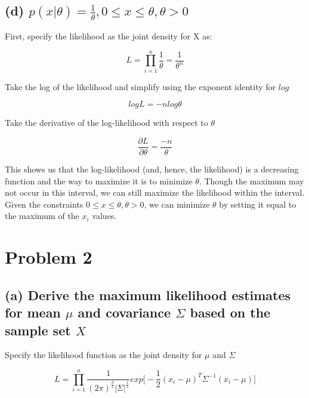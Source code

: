 \documentclass{article}
\begin{document}
\subsection{(d) $p(x|\theta) = \frac{1}{\theta}, 0 \leq x \leq \theta, \theta > 0$}

\noindent First, specify the likelihood as the joint density for X as:

\begin{equation}
L = \prod\limits_{i = 1}^n \frac{1}{\theta} = \frac{1}{\theta^n}
\end{equation}

\noindent Take the log of the likelihood and simplify using the exponent identity for $log$

\begin{equation}
log L = - n log \theta
\end{equation}

\noindent Take the derivative of the log-likelihood with respect to $\theta$

\begin{equation}
\frac{\partial L}{ \partial \theta } = \frac{-n}{\theta}
\end{equation}

\noindent This shows us that the log-likelihood (and, hence, the likelihood) is a decreasing function and the way to maximize it is to minimize $\theta$.  Though the maximum may not occur in this interval, we can still maximize the likelihood within the interval. Given the constraints $0 \leq x \leq \theta, \theta > 0$, we can minimize $\theta$ by setting it equal to the maximum of the $x_i$ values.

\section{Problem 2}

\subsection{(a) Derive the maximum likelihood estimates for mean $\mu$ and covariance $\Sigma$ based on the sample set $X$}

\noindent Specify the likelihood function as the joint density for $\mu$ and $\Sigma$

\begin{equation}
L = \prod\limits_{i = 1}^n \frac{1}{(2\pi)^{\frac{d}{2}} | \Sigma |^{\frac{1}{2}}} exp \bigg[ -\frac{1}{2} (x_i - \mu)^T \Sigma^{-1} (x_i - \mu)  \bigg]
\end{equation}
\end{document}
